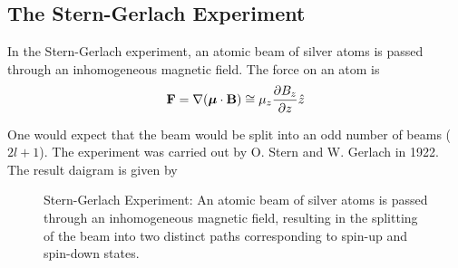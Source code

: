\subsection{The Stern-Gerlach Experiment}

In the Stern-Gerlach experiment, an atomic beam of silver atoms is passed through an inhomogeneous magnetic field. The force on an atom is 
\begin{align}
    \mathbf{F} = \nabla (\boldsymbol{\mu} \cdot \mathbf{B}) \cong \mu_z \frac{\partial B_z}{\partial z} \hat{z}
\end{align}

One would expect that the beam would be split into an odd number of beams ($2l+1$). The experiment was carried out by O. Stern and W. Gerlach in 1922. The result daigram is given by 

\begin{figure}[!h]
    \centering 
    
    \caption{Stern-Gerlach Experiment: An atomic beam of silver atoms is passed through an inhomogeneous magnetic field, resulting in the splitting of the beam into two distinct paths corresponding to spin-up and spin-down states.}
    \label{fig:stern-gerlach}
\end{figure}
